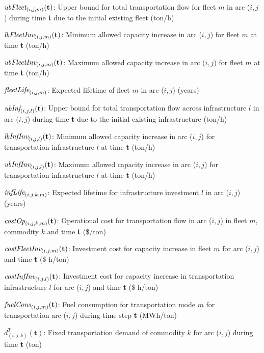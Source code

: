 \documentclass{article}
\begin{document}
\begin{description}
\item $\emph{ubFleet}_{(i,j,m)}(\textbf{t})$: Upper bound for total transportation flow for fleet $m$ in arc ($i,j$) during time \textbf{t} due to the initial existing fleet (ton/h)
\item $\emph{lbFleetInv}_{(i,j,m)}(\textbf{t})$: Minimum allowed capacity increase in arc ($i,j$) for fleet $m$ at time \textbf{t} (ton/h)
\item $\emph{ubFleetInv}_{(i,j,m)}(\textbf{t})$: Maximum allowed capacity increase in arc ($i,j$) for fleet $m$ at time \textbf{t} (ton/h)
\item $\emph{fleetLife}_{(i,j,m)}$: Expected lifetime of fleet $m$ in arc ($i,j$) (years)
\item $\emph{ubInf}_{(i,j,l)}(\textbf{t})$: Upper bound for total transportation flow across infrastructure $l$ in arc ($i,j$) during time \textbf{t} due to the initial existing infrastructure (ton/h)
\item $\emph{lbInfInv}_{(i,j,l)}(\textbf{t})$: Minimum allowed capacity increase in arc ($i,j$) for transportation infrastructure $l$ at time \textbf{t} (ton/h)
\item $\emph{ubInfInv}_{(i,j,l)}(\textbf{t})$: Maximum allowed capacity increase in arc ($i,j$) for transportation infrastructure $l$ at time \textbf{t} (ton/h)
\item $\emph{infLife}_{(i,j,k,m)}$: Expected lifetime for infrastructure investment $l$ in arc ($i,j$) (years)
\item $\emph{costOp}_{(i,j,k,m)}(\textbf{t})$: Operational cost for transportation flow in arc ($i,j$) in fleet $m$, commodity $k$ and time \textbf{t} (\$/ton)
\item $\emph{costFleetInv}_{(i,j,m)}(\textbf{t})$: Investment cost for capacity increase in fleet $m$ for arc ($i,j$) and time \textbf{t} (\$ h/ton)
\item $\emph{costInfInv}_{(i,j,l)}(\textbf{t})$: Investment cost for capacity increase in transportation infrastructure $l$ for arc ($i,j$) and time \textbf{t} (\$ h/ton)
\item $\emph{fuelCons}_{(i,j,m)}(\textbf{t})$: Fuel consumption for transportation mode $m$ for transportation arc ($i,j$) during time step \textbf{t} (MWh/ton)
\item $d^T_{(i,j,k)}(\textbf{t})$: Fixed transportation demand of commodity $k$ for arc ($i,j$) during time \textbf{t} (ton)
\end{description}
\end{document}
